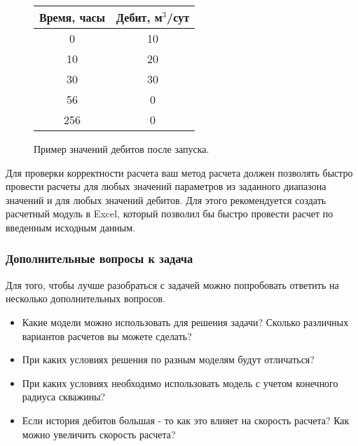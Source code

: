 \begin{figure}[h!]\TopFloatBoxes
	\begin{floatrow}
		\ttabbox[\FBwidth]{\label{table:data2}}%
		{
			\begin{tabular}{|c|c|}
				\hline
				\rowcolor{lightgray}	Время, часы& Дебит, м$^3$/сут  \\
				\hline
				0 & 10  \\
				\hline
				10 & 20  \\
				\hline
				30 & 30  \\
				\hline
				56 & 0  \\
				\hline
				256 & 0 \\
				\hline
			\end{tabular}
			\caption{Пример значений дебитов после запуска.}
		}
		\killfloatstyle
		        {
				}
	\end{floatrow}

\end{figure}


Для проверки корректности расчета ваш метод расчета должен позволять быстро провести расчеты для любых значений параметров из заданного диапазона значений и для любых значений дебитов. Для этого рекомендуется создать расчетный модуль в Excel, который позволил бы быстро провести расчет по введенным исходным данным.

\subsubsection{Дополнительные вопросы к задача}

Для того, чтобы лучше разобраться с задачей можно попробовать ответить на несколько дополнительных вопросов.
\begin{itemize}
	\item Какие модели можно использовать для решения задачи? Сколько различных вариантов расчетов вы можете сделать? 
	\item При каких условиях решения по разным моделям будут отличаться?
	\item При каких условиях необходимо использовать модель с учетом конечного радиуса скважины?
	\item Если история дебитов большая - то как это влияет на скорость расчета? Как можно увеличить скорость расчета?
\end{itemize}

